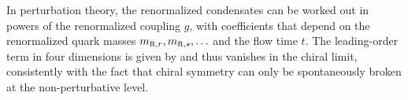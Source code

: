 In perturbation theory,
the renormalized condensates 
can be worked out in powers of the renormalized coupling $g$,
with coefficients that depend on the renormalized quark masses 
$\mR{r},\mR{s},\ldots$ and the flow time $t$.
The leading-order term in four dimensions is given by
and thus vanishes in the chiral limit,
consistently with the fact that chiral symmetry can only
be spontaneously broken at the non-perturbative level.
